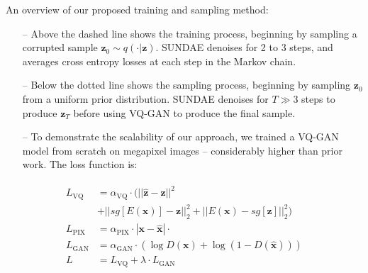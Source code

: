 \documentclass[14pt,margin=0.5in,innermargin=0in,blockverticalspace=-0.1in,colspace=-1.2cm]{tikzposter}
\begin{document}
\begin{columns}
{\begin{tcolorbox}[boxsep=0pt,top=0cm,bottom=0.6cm,adjusted title={\huge\bf Proposed Method},colbacktitle=colorOne]
        {
            \Large
            An overview of our proposed training and sampling method:
            \begin{itemize}
                \item[--] Above the dashed line shows the training process,
                    beginning by sampling a corrupted sample $\mathbf{z}_0 \sim
                    q( \cdot \vert \mathbf{z})$. SUNDAE denoises for 2 to 3
                    steps, and averages cross entropy losses at each step in the
                    Markov chain.
                \item[--] Below the dotted line shows the sampling process,
                    beginning by sampling $\mathbf{z}_0$ from a uniform prior
                    distribution. SUNDAE denoises for $T \gg 3$ steps to produce
                    $\mathbf{z}_T$ before using VQ-GAN to produce the final
                    sample.
                \item[--] To demonstrate the scalability of our approach, we
                    trained a VQ-GAN model from scratch on megapixel images -- 
                    considerably higher than prior work. The loss function is:
            \end{itemize}
        }
            {
                \large
                \centering
        \begin{minipage}{0.49\linewidth}
            \begin{align*}
            \begin{split}
                L_\text{VQ} &= \alpha_\text{VQ} \cdot (||\hat{\mathbf{z}} -
                \mathbf{z}||^2 \\
                            &+ ||sg[E(\mathbf{x})] - \mathbf{z}||^2_2 +
                ||E(\mathbf{x}) - sg[\mathbf{z}]||^2_2)\\
                L_\text{PIX} &= \alpha_\text{PIX} \cdot |\mathbf{x} -
                \hat{\mathbf{x}}| \cdot \\
                L_\text{GAN} &= \alpha_\text{GAN} \cdot \left(\log D(\mathbf{x}) + \log
                (1-D(\hat{\mathbf{x}}))\right) \\
                L &= L_\text{VQ} + \lambda \cdot L_\text{GAN}
            \end{split}
            \end{align*}
        \end{minipage}
        \hfill
        \begin{minipage}{0.49\linewidth}
            \begin{align*}

\end{align*}
\end{minipage}}
\end{tcolorbox}}
\end{columns}
\end{document}
